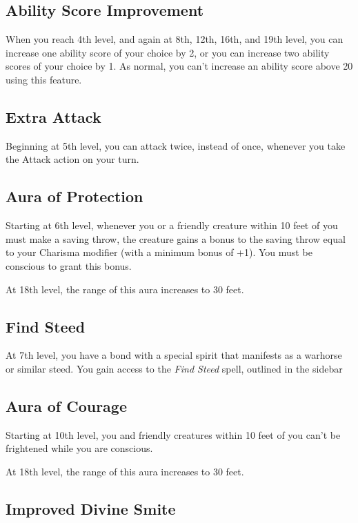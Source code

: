 \subsection{Ability Score Improvement}

When you reach 4th level, and again at 8th, 12th, 16th, and 19th level, you can increase one ability score of your choice by 2, or you can increase two ability scores of your choice by 1. As normal, you can't increase an ability score above 20 using this feature.

\subsection{Extra Attack}

Beginning at 5th level, you can attack twice, instead of once, whenever you take the Attack action on your turn.

\subsection{Aura of Protection}

Starting at 6th level, whenever you or a friendly creature within 10 feet of you must make a saving throw, the creature gains a bonus to the saving throw equal to your Charisma modifier (with a minimum bonus of +1). You must be conscious to grant this bonus.

At 18th level, the range of this aura increases to 30 feet.

\subsection{Find Steed}

At 7th level, you have a bond with a special spirit that manifests as a warhorse or similar steed. You gain access to the \textit{Find Steed} spell, outlined in the sidebar 

\subsection{Aura of Courage}

Starting at 10th level, you and friendly creatures within 10 feet of you can't be frightened while you are conscious.

At 18th level, the range of this aura increases to 30 feet.

\subsection{Improved Divine Smite}

